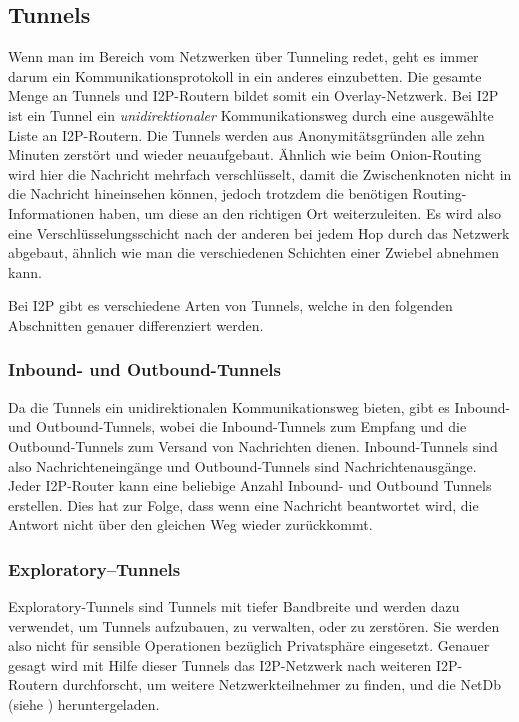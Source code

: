 \subsection{Tunnels}

Wenn man im Bereich vom Netzwerken über Tunneling redet, geht es immer darum ein Kommunikationsprotokoll in ein anderes einzubetten. \parencite{noauthor_duden_nodate}
Die gesamte Menge an Tunnels und I2P-Routern bildet somit ein Overlay-Netzwerk.
Bei I2P ist ein Tunnel ein \textit{unidirektionaler} Kommunikationsweg durch eine ausgewählte Liste an I2P-Routern.
Die Tunnels werden aus Anonymitätsgründen alle zehn Minuten zerstört und wieder neuaufgebaut.
Ähnlich wie beim Onion-Routing wird hier die Nachricht mehrfach verschlüsselt, damit die Zwischenknoten nicht in die Nachricht hineinsehen können, jedoch trotzdem die benötigen Routing-Informationen haben, um diese an den richtigen Ort weiterzuleiten.
Es wird also eine Verschlüsselungsschicht nach der anderen bei jedem Hop durch das Netzwerk abgebaut,
ähnlich wie man die verschiedenen Schichten einer Zwiebel abnehmen kann.

Bei I2P gibt es verschiedene Arten von Tunnels, welche in den folgenden Abschnitten genauer differenziert werden.
\parencites{noauthor_intro_nodate}[S.~2]{liu_empirical_2014}

\subsubsection{Inbound- und Outbound-Tunnels}
Da die Tunnels ein unidirektionalen Kommunikationsweg bieten, gibt es Inbound- und Outbound-Tunnels,
wobei die Inbound-Tunnels zum Empfang und die Outbound-Tunnels zum Versand von Nachrichten dienen.
Inbound-Tunnels sind also Nachrichteneingänge und Outbound-Tunnels sind Nachrichtenausgänge.
Jeder I2P-Router kann eine beliebige Anzahl Inbound- und Outbound Tunnels erstellen.
Dies hat zur Folge, dass wenn eine Nachricht beantwortet wird, die Antwort nicht über den gleichen Weg wieder zurückkommt.
\parencite{noauthor_intro_nodate}

\subsubsection{Exploratory--Tunnels}

Exploratory-Tunnels sind Tunnels mit tiefer Bandbreite und werden dazu verwendet, um Tunnels aufzubauen, zu verwalten, oder zu zerstören.
Sie werden also nicht für sensible Operationen bezüglich Privatsphäre eingesetzt.
Genauer gesagt wird mit Hilfe dieser Tunnels das I2P-Netzwerk nach weiteren I2P-Routern durchforscht, um weitere Netzwerkteilnehmer zu finden, und die NetDb (siehe ) heruntergeladen.
\parencite[S.~4]{conrad_survey_2014}

